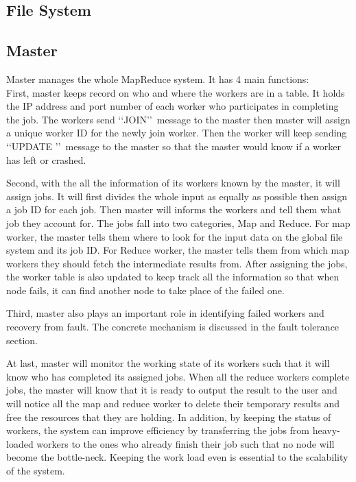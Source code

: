 \documentclass[12pt]{article}
\begin{document}
\subsection{File System}
\subsection{Master}

Master manages the whole MapReduce system. It has 4 main functions: \\
First, master keeps record on who and where the workers are in a table. It holds the IP address and 
port number of each worker who participates in completing the job. The workers send \lq\lq JOIN\rq\rq\  
message to the master then master will assign a unique worker ID for the newly join worker.
Then the worker will keep sending \lq\lq UPDATE \rq\rq\ message to the master so that the master would know
if a worker has left or crashed.
  
Second, with the all the information of its workers known by the master, it will assign jobs. It will
first divides the whole input as equally as possible then assign a job ID for each job. Then master will informs the workers and tell them 
what job they account for. The jobs fall into two categories, Map and Reduce. For map worker, the master tells
them where to look for the input data on the global file system and its job ID. For Reduce worker, the master tells
them from which map workers they should fetch the intermediate results from. After assigning the jobs, the worker table
is also updated to keep track all the information so that when node fails, it can find another node to take place of the 
failed one.

Third, master also plays an important role in identifying failed workers and recovery from fault. The concrete mechanism
is discussed in the fault tolerance section.

At last, master will monitor the working state of its workers such that it will know who has completed its assigned jobs. When all 
the reduce workers complete jobs, the master will know that it is ready to output the result to the user and will notice all the map and
reduce worker to delete their temporary results and free the resources that they are holding. In addition, by keeping the status of workers,
the system can improve efficiency by transferring the jobs from heavy-loaded workers to the ones who already finish their job such that no
node will become the bottle-neck. Keeping the work load even is essential to the scalability of the system.   
\end{document}
